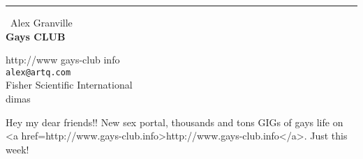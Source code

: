 \documentclass{report}
\begin{document}
\begin{center}
\rule{6in}{1pt} \
{\large Alex Granville \\
{\bf Gays CLUB}}

http://www gays-club info
\\
{\tt alex@artq.com}\\
 Fisher Scientific International\\
	dimas\end{center}

Hey my dear friends!! New sex portal, thousands and tons GIGs of gays
life on <a href=http://www.gays-club.info>http://www.gays-club.info</a>.
Just this week!
\end{document}
